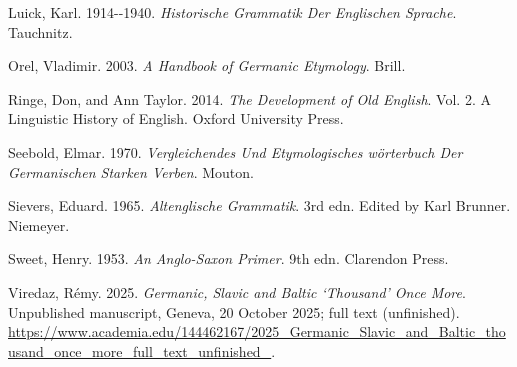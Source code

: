 \documentclass[
  british,
  a4paper,
]{article}
\newlength{\cslhangindent}
\newenvironment{CSLReferences}[2] %
 {\begin{list}{}{%
  \setlength{\itemindent}{0pt}
  \setlength{\leftmargin}{0pt}
  \setlength{\parsep}{0pt}
  \ifodd #1
   \setlength{\leftmargin}{\cslhangindent}
   \setlength{\itemindent}{-1\cslhangindent}
  \fi
  \setlength{\itemsep}{#2\baselineskip}}}
 {\end{list}}
\begin{document}
\begin{CSLReferences}{1}{1}
Luick, Karl. 1914-\/-1940. \emph{Historische Grammatik Der Englischen
Sprache}. Tauchnitz.

Orel, Vladimir. 2003. \emph{A Handbook of {Germanic} Etymology}. Brill.

Ringe, Don, and Ann Taylor. 2014. \emph{The Development of {Old
English}}. Vol. 2. A Linguistic History of English. Oxford University
Press.

Seebold, Elmar. 1970. \emph{Vergleichendes Und Etymologisches
w{ö}rterbuch Der Germanischen Starken Verben}. Mouton.

Sievers, Eduard. 1965. \emph{Altenglische Grammatik}. 3rd edn. Edited by
Karl Brunner. Niemeyer.

Sweet, Henry. 1953. \emph{An {Anglo-Saxon} Primer}. 9th edn. Clarendon
Press.

Viredaz, Rémy. 2025. \emph{{Germanic}, {Slavic} and {Baltic}
{`Thousand'} Once More}. Unpublished manuscript, Geneva, 20 October
2025; full text (unfinished).
\url{https://www.academia.edu/144462167/2025_Germanic_Slavic_and_Baltic_thousand_once_more_full_text_unfinished_}.

\end{CSLReferences}
\end{document}
